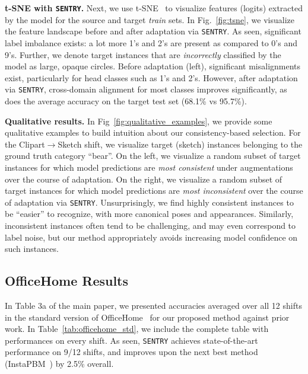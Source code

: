\documentclass[10pt,twocolumn,letterpaper]{article}
\newcommand{\method}{\texttt{SENTRY}\xspace}
\begin{document}
\noindent \textbf{t-SNE with \method.} Next, we use t-SNE~\cite{maaten2008visualizing} to visualize features (logits) extracted by the model for the source and target \emph{train} sets. In Fig.~\ref{fig:tsne}, we visualize the feature landscape before and after adaptation via \method. As seen, significant label imbalance exists: \eg a lot more 1's and 2's are present as compared to 0's and 9's. Further, we denote target instances that are \emph{incorrectly} classified by the model as large, opaque circles. Before adaptation (left), significant misalignments exist, particularly for head classes such as 1's and 2's. However, after adaptation via \method, cross-domain alignment for most classes improves significantly, as does the average accuracy on the target test set (68.1\% vs 95.7\%).


\noindent \textbf{Qualitative results.} In Fig~\ref{fig:qualitative_examples}, we provide some qualitative examples to build intuition about our consistency-based selection. For the Clipart$\rightarrow$Sketch shift, we visualize target (\ie sketch) instances belonging to the ground truth category ``bear''. On the left, we visualize a random subset of target instances for which model predictions are \emph{most consistent} under augmentations over the course of adaptation. On the right, we visualize a random subset of target instances for which model predictions are \emph{most inconsistent} over the course of adaptation via \method. Unsurprisingly, we find highly consistent instances to be ``easier'' to recognize, with more canonical poses and appearances. Similarly, inconsistent instances often tend to be challenging, and may even correspond to label noise, but our method appropriately avoids increasing model confidence on such instances.



\subsection{OfficeHome Results} 

In Table 3a of the main paper, we presented accuracies averaged over all 12 shifts in the standard version of OfficeHome~\cite{venkateswara2017deep} for our proposed method against prior work. In Table~\ref{tab:officehome_std}, we include the complete table with performances on every shift. As seen, \method achieves state-of-the-art performance on 9/12 shifts, and improves upon the next best method (InstaPBM~\cite{li2020rethinking}) by 2.5\% overall.
\end{document}
